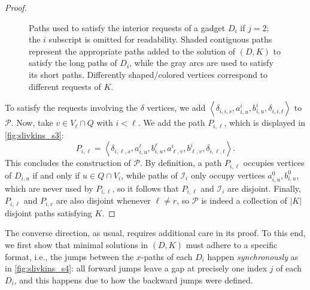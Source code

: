 \documentclass[a4paper,UKenglish,cleveref, autoref, thm-restate]{lipics-v2021}
\newcommand{\angled}[1]{\left\langle{#1}\right\rangle}
\begin{document}
\begin{proof}
\begin{figure}[!htb]
        \caption{Paths used to satisfy the interior requests of a gadget $D_i$ if $j = 2$; the $i$
          subscript is omitted for readability. Shaded contiguous paths represent the
          appropriate paths added to the solution of $(D, K)$ to satisfy the long paths of
          $D_i$, while the gray arcs are used to satisfy its short paths. Differently
        shaped/colored vertices correspond to different requests of $K$.\label{fig:slivkins_s4}}
      \end{figure}

      To satisfy the requests involving the $\delta$ vertices, we add
      $\angled{\delta_{i,i,s}, a^i_{i,u}, b^i_{i,u}, \delta_{i,i,t}}$ to $\mathcal{P}$. Now, take $v
      \in V_\ell \cap Q$ with $i < \ell$. We add the path $P_{i,\ell}$, which is displayed
      in \autoref{fig:slivkins_s3}:
      \begin{equation*}
        P_{i,\ell} = \angled{\delta_{i,\ell,s}, a^\ell_{i,u}, b^\ell_{i,u}, a^i_{\ell,v},
        b^i_{\ell,v}, \delta_{i,\ell,t}}.
      \end{equation*}
      This concludes the construction of $\mathcal{P}$.
      By definition, a path $P_{i,\ell}$ occupies vertices of $D_{i,u}$ if and only if $u
      \in Q \cap V_i$, while paths of $\mathcal{I}_i$ only occupy vertices $a^0_{i,u},
      b^0_{i,u}$, which are never used by $P_{i, \ell}$, so it follows that $P_{i, \ell}$
      and $\mathcal{I}_i$ are disjoint.
      Finally, $P_{i,\ell}$ and $P_{i,r}$ are also disjoint whenever $\ell \neq r$, so
      $\mathcal{P}$ is indeed a collection of $|K|$ disjoint paths satisfying $K$.
    \end{proof}

    The converse direction, as usual, requires additional care in its proof. To this end,
    we first show that minimal solutions in $(D,K)$ must adhere to a specific format, i.e., the
    jumps between the $x$-paths of each $D_i$ happen \textit{synchronously} as in
    \autoref{fig:slivkins_s4}: all forward jumps leave a gap at precisely one index
    $j$ of each $D_i$, and this happens due to how the backward jumps were defined.
\end{document}
